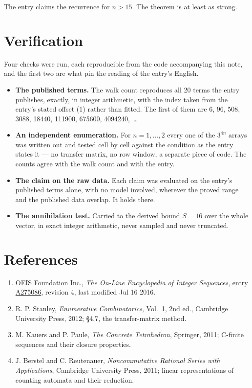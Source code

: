 \documentclass[11pt]{article}
\theoremstyle{definition}
\begin{document}
The entry claims the recurrence for $n > 15$. The theorem is at least as strong.

\section{Verification}

Four checks were run, each reproducible from the code accompanying this note, and the first two are what pin the reading of the entry's English.

\begin{itemize}

\item {\bfseries The published terms.} The walk count reproduces all 20 terms the entry publishes, exactly, in integer arithmetic, with the index taken from the entry's stated offset (1) rather than fitted. The first of them are 6, 96, 508, 3088, 18440, 111900, 675600, 4094240,~\dots

\item {\bfseries An independent enumeration.} For $n = 1,\dots,2$ every one of the $3^{4n}$ arrays was written out and tested cell by cell against the condition as the entry states it --- no transfer matrix, no row window, a separate piece of code. The counts agree with the walk count and with the entry.

\item {\bfseries The claim on the raw data.} Each claim was evaluated on the entry's published terms alone, with no model involved, wherever the proved range and the published data overlap. It holds there.

\item {\bfseries The annihilation test.} Carried to the derived bound $S = 16$ over the whole vector, in exact integer arithmetic, never sampled and never truncated.

\end{itemize}

\section{References}

\begin{enumerate}

\item OEIS Foundation Inc., \emph{The On-Line Encyclopedia of Integer Sequences}, entry \href{https://oeis.org/A275086}{A275086}, revision 4, last modified Jul 16 2016.

\item R. P. Stanley, \emph{Enumerative Combinatorics}, Vol.~1, 2nd ed., Cambridge University Press, 2012; \S4.7, the transfer-matrix method.

\item M. Kauers and P. Paule, \emph{The Concrete Tetrahedron}, Springer, 2011; C-finite sequences and their closure properties.

\item J. Berstel and C. Reutenauer, \emph{Noncommutative Rational Series with Applications}, Cambridge University Press, 2011; linear representations of counting automata and their reduction.

\end{enumerate}
\end{document}
